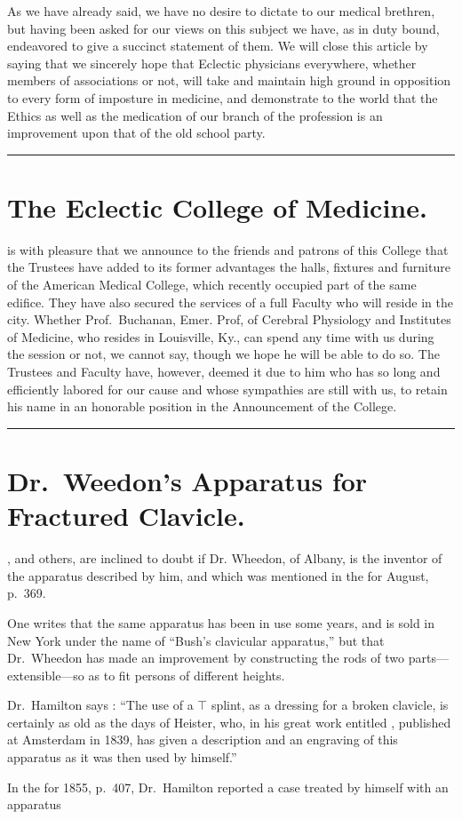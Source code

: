 
As we have already said, we have no desire to dictate to our medical
brethren, but having been asked for our views on this subject we
have, as in duty bound, endeavored to give a succinct statement of them.
We will close this article by saying that we sincerely hope that Eclectic
physicians everywhere, whether members of associations or not, will
take and maintain high ground in opposition to every form of imposture
in medicine, and demonstrate to the world that the Ethics as well
as the medication of our branch of the profession is an improvement
upon that of the old school party.

\fancybreak{*}

\section*{The Eclectic College of Medicine.}

 is with pleasure that we announce to the friends and patrons of this
College that the Trustees have added to its former advantages the halls,
fixtures and furniture of the American Medical College, which recently
occupied part of the same edifice. They have also secured the services
of a full Faculty who will reside in the city. Whether Prof.~Buchanan,
Emer. Prof, of Cerebral Physiology and Institutes of Medicine, who
resides in Louisville, Ky., can spend any time with us during the session
or not, we cannot say, though we hope he will be able to do so. The
Trustees and Faculty have, however, deemed it due to him who has so
long and efficiently labored for our cause and whose sympathies are still
with us, to retain his name in an honorable position in the Announcement
of the College.

\fancybreak{*}

\section*{Dr.~Weedon's Apparatus for Fractured Clavicle.}

, and others, are inclined to doubt if Dr.
Wheedon, of Albany, is the inventor of the apparatus described by him,
and which was mentioned in the  for August, p.\ 369.

One writes that the same apparatus has been in use some years, and
is sold in New York under the name of ``Bush's clavicular apparatus,''
but that Dr.~Wheedon has made an improvement by constructing the
rods of two parts---extensible---so as to fit persons of different heights.

Dr.~Hamilton says : ``The use of a $\top$ splint, as a dressing for a broken
clavicle, is certainly as old as the days of Heister, who, in his great work
entitled , published at Amsterdam in 1839, has
given a description and an engraving of this apparatus as it was then
used by himself.''

In the  for 1855,
p.~407, Dr.~Hamilton reported a case treated by himself with an apparatus\endinput
